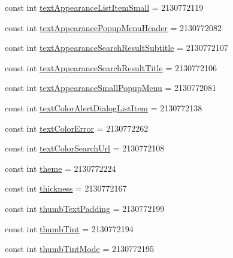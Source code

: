 \begin{DoxyCompactItemize}
const int \mbox{\hyperlink{class_f_w_p_s___app_1_1_droid_1_1_resource_1_1_attribute_a96111bbc9e02d865c948d5810218c83a}{text\+Appearance\+List\+Item\+Small}} = 2130772119
\item 
const int \mbox{\hyperlink{class_f_w_p_s___app_1_1_droid_1_1_resource_1_1_attribute_a49cbe0f5368ecde4337e3f1cd0a4476d}{text\+Appearance\+Popup\+Menu\+Header}} = 2130772082
\item 
const int \mbox{\hyperlink{class_f_w_p_s___app_1_1_droid_1_1_resource_1_1_attribute_ad6bb137da86a4b4b71ac404902b4e51c}{text\+Appearance\+Search\+Result\+Subtitle}} = 2130772107
\item 
const int \mbox{\hyperlink{class_f_w_p_s___app_1_1_droid_1_1_resource_1_1_attribute_a67a76ea74e88adf8c7736f4e0e699182}{text\+Appearance\+Search\+Result\+Title}} = 2130772106
\item 
const int \mbox{\hyperlink{class_f_w_p_s___app_1_1_droid_1_1_resource_1_1_attribute_a09bfdc30b44b726079cce4d94c3cf3b6}{text\+Appearance\+Small\+Popup\+Menu}} = 2130772081
\item 
const int \mbox{\hyperlink{class_f_w_p_s___app_1_1_droid_1_1_resource_1_1_attribute_a6e93e3af4ce1fe5f3f8c422d0b8d019f}{text\+Color\+Alert\+Dialog\+List\+Item}} = 2130772138
\item 
const int \mbox{\hyperlink{class_f_w_p_s___app_1_1_droid_1_1_resource_1_1_attribute_ab96c17887e32e60902ff932163f616b3}{text\+Color\+Error}} = 2130772262
\item 
const int \mbox{\hyperlink{class_f_w_p_s___app_1_1_droid_1_1_resource_1_1_attribute_a8751cb6c9496bb0e8bf6d28e80a959f1}{text\+Color\+Search\+Url}} = 2130772108
\item 
const int \mbox{\hyperlink{class_f_w_p_s___app_1_1_droid_1_1_resource_1_1_attribute_a7fd36bff20b81e780127f3bf9794e7da}{theme}} = 2130772224
\item 
const int \mbox{\hyperlink{class_f_w_p_s___app_1_1_droid_1_1_resource_1_1_attribute_af3867f20f2127b3943045d37042f80b2}{thickness}} = 2130772167
\item 
const int \mbox{\hyperlink{class_f_w_p_s___app_1_1_droid_1_1_resource_1_1_attribute_a91d744d9cd018f586d5189ab4a75a776}{thumb\+Text\+Padding}} = 2130772199
\item 
const int \mbox{\hyperlink{class_f_w_p_s___app_1_1_droid_1_1_resource_1_1_attribute_a1320ca4d8598b0f05fe1d6b6592a0884}{thumb\+Tint}} = 2130772194
\item 
const int \mbox{\hyperlink{class_f_w_p_s___app_1_1_droid_1_1_resource_1_1_attribute_ae703699a93e32c85f26916132cc43a95}{thumb\+Tint\+Mode}} = 2130772195

\end{DoxyCompactItemize}
